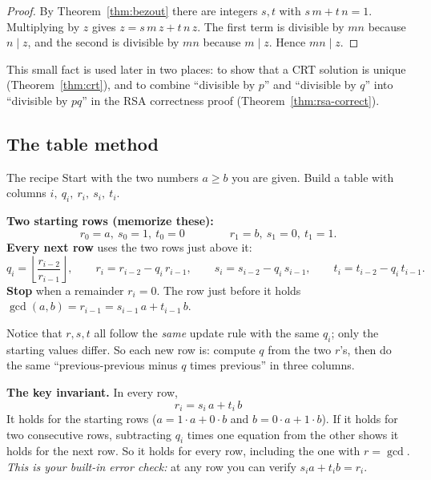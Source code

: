 \documentclass[11pt]{article}
\theoremstyle{definition}
\theoremstyle{remark}
\begin{document}
\begin{proof}
By Theorem~\ref{thm:bezout} there are integers $s,t$ with $s\,m+t\,n=1$. Multiplying by $z$ gives $z=s\,m\,z+t\,n\,z$. The first term is divisible by $mn$ because $n\mid z$, and the second is divisible by $mn$ because $m\mid z$. Hence $mn\mid z$.
\end{proof}

This small fact is used later in two places: to show that a CRT solution is unique (Theorem~\ref{thm:crt}), and to combine ``divisible by $p$'' and ``divisible by $q$'' into ``divisible by $pq$'' in the RSA correctness proof (Theorem~\ref{thm:rsa-correct}).


\subsection{The table method}\label{sec:eea-table}

\begin{recipe}{The recipe}
Start with the two numbers $a\ge b$ you are given. Build a table with columns $i,\ q_i,\ r_i,\ s_i,\ t_i$.

\textbf{Two starting rows (memorize these):}
\[
r_0=a,\ s_0=1,\ t_0=0\qquad\qquad r_1=b,\ s_1=0,\ t_1=1.
\]
\textbf{Every next row} uses the two rows just above it:
\[
q_i=\left\lfloor \frac{r_{i-2}}{r_{i-1}}\right\rfloor,\qquad
r_i=r_{i-2}-q_i\,r_{i-1},\qquad
s_i=s_{i-2}-q_i\,s_{i-1},\qquad
t_i=t_{i-2}-q_i\,t_{i-1}.
\]
\textbf{Stop} when a remainder $r_i=0$. The row just before it holds $\gcd(a,b)=r_{i-1}=s_{i-1}\,a+t_{i-1}\,b$.
\end{recipe}

Notice that $r,s,t$ all follow the \emph{same} update rule with the same $q_i$; only the starting values differ. So each new row is: compute $q$ from the two $r$'s, then do the same ``previous-previous minus $q$ times previous'' in three columns.

\textbf{The key invariant.} In every row,
\[
\boxed{\,r_i = s_i\,a + t_i\,b\,}
\]
It holds for the starting rows ($a=1\cdot a+0\cdot b$ and $b=0\cdot a+1\cdot b$). If it holds for two consecutive rows, subtracting $q_i$ times one equation from the other shows it holds for the next row. So it holds for every row, including the one with $r=\gcd$. \emph{This is your built-in error check:} at any row you can verify $s_i a+t_ib=r_i$.
\end{document}
